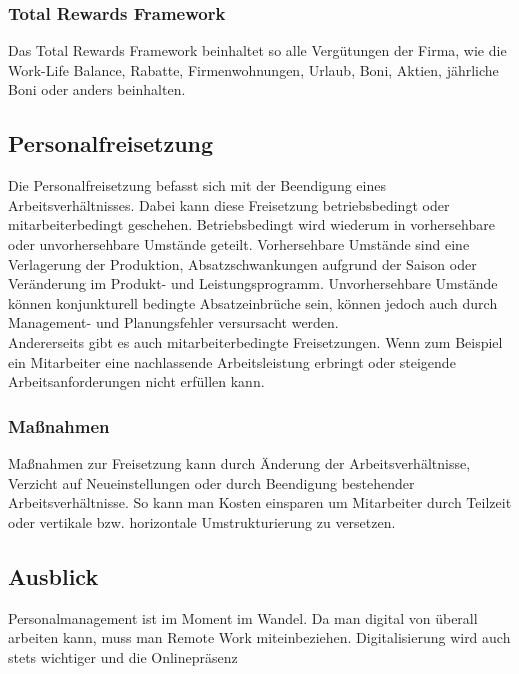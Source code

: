 \documentclass{article}
\begin{document}
	\subsubsection{Total Rewards Framework}
	Das Total Rewards Framework beinhaltet so alle Vergütungen der Firma, wie die Work-Life Balance, Rabatte, Firmenwohnungen, Urlaub, Boni, Aktien, jährliche Boni oder anders beinhalten.
	\subsection{Personalfreisetzung}
	Die Personalfreisetzung befasst sich mit der Beendigung eines Arbeitsverhältnisses. Dabei kann diese Freisetzung betriebsbedingt oder mitarbeiterbedingt geschehen. Betriebsbedingt wird wiederum in vorhersehbare oder unvorhersehbare Umstände geteilt. Vorhersehbare Umstände sind eine Verlagerung der Produktion, Absatzschwankungen aufgrund der Saison oder Veränderung im Produkt- und Leistungsprogramm. Unvorhersehbare Umstände können konjunkturell bedingte Absatzeinbrüche sein, können jedoch auch durch Management- und Planungsfehler versursacht werden. \\
	Andererseits gibt es auch mitarbeiterbedingte Freisetzungen. Wenn zum Beispiel ein Mitarbeiter eine nachlassende Arbeitsleistung erbringt oder steigende Arbeitsanforderungen nicht erfüllen kann. 
	\subsubsection{Maßnahmen}
	Maßnahmen zur Freisetzung kann durch Änderung der Arbeitsverhältnisse, Verzicht auf Neueinstellungen oder durch Beendigung bestehender Arbeitsverhältnisse. So kann man Kosten einsparen um Mitarbeiter durch Teilzeit oder vertikale bzw. horizontale Umstrukturierung zu versetzen.
	\subsection{Ausblick}
	Personalmanagement ist im Moment im Wandel. Da man digital von überall arbeiten kann, muss man Remote Work miteinbeziehen. Digitalisierung wird auch stets wichtiger und die Onlinepräsenz






















  
\end{document}
